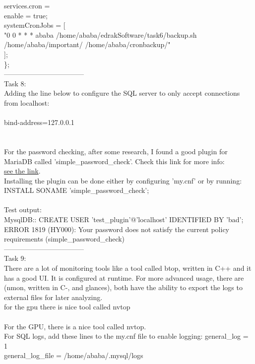 \documentclass[a4paper,14pt]{extarticle}
\begin{document}
services.cron = {\\
    enable = true;\\
    systemCronJobs = [\\
      "0 0 * * *  ababa    /home/ababa/edrakSoftware/task6/backup.sh /home/ababa/important/ /home/ababa/cronbackup/"\\
   ];\\
\};\\
-----------------------------------\\
\newpage
Task 8:\\
Adding the line below to configure the SQL server to only accept connections from localhost:\\
\\
bind-address=127.0.0.1\\
\\
\\
For the password checking, after some research, I found a good plugin for MariaDB called 'simple\_password\_check'. Check this link for more info:\\ 
\href{https://mariadb.com/kb/en/simple-password-check-plugin/}{see the link}.\\
Installing the plugin can be done either by configuring 'my.cnf' or by running:\\
INSTALL SONAME 'simple\_password\_check';\\
\\
Test output:\\
MysqlDB:: CREATE USER 'test\_plugin'@'localhost' IDENTIFIED BY 'bad';\\
ERROR 1819 (HY000): Your password does not satisfy the current policy requirements (simple\_password\_check)\\
-----------------------------------\\
Task 9:\\
There are a lot of monitoring tools like a tool called btop, written in C++ and it has a good UI. It is configured at runtime. For more advanced usage,
there are (nmon, written in C-, and glances), both have the ability to export the logs to external files for later analyzing.\\
for the gpu there is nice tool called nvtop \\
\\
For the GPU, there is a nice tool called nvtop.
\\
For SQL logs, add these lines to the my.cnf file to enable logging:
general\_log = 1\\
general\_log\_file = /home/ababa/.mysql/logs\\
}
\end{document}
